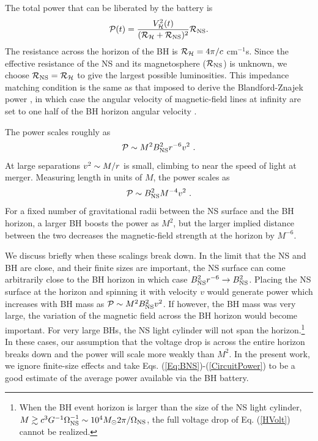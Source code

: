 The total power that can be liberated by the battery is
\begin{align}
\label{CircuitPower}
\mathcal{P}(t) = \frac{ V^2_{\mathcal{H}}(t) }{( \mathcal{R}_{\mathcal{H}} +
  \mathcal{R}_{\rm NS} )^2 } \mathcal{R}_{\rm NS} .
\end{align}
The resistance across the horizon of the BH is
$\mathcal{R}_{\mathcal{H}}=4\pi/c$ cm$^{-1}$s.  Since the effective
resistance of the NS and its magnetosphere ($\mathcal{R}_{\rm NS}$) is
unknown, we choose $\mathcal{R}_{\rm NS} = \mathcal{R}_{\mathcal{H}}$ to give the
largest possible luminosities. This impedance matching condition is
the same as that imposed to derive the Blandford-Znajek power
\citep{BZ:1977}, in which case the angular velocity of magnetic-field
lines at infinity are set to one half of the BH horizon angular
velocity \citep{MPBook, Penna:ImpMatch2015}.


The power scales roughly as
\begin{equation}
\mathcal{P} \sim M^2 B_{\rm NS}^2 r^{-6} v^{2} \ .
\end{equation}
At large separations $v^2 \sim M/r$ is small, climbing to near the
speed of light at merger.  Measuring length in units of $M$, the power
scales as
\begin{equation}
\mathcal{P} \sim B_{\rm NS}^2 M^{-4} v^{2} \ .
\end{equation}
For a fixed number of gravitational radii between the NS surface and
the BH horizon, a larger BH boosts the power as $M^2$, but the larger
implied distance between the two decreases the magnetic-field strength
at the horizon by $M^{-6}$.

We discuss briefly when these scalings break down. In the limit that
the NS and BH are close, and their finite sizes are important, the NS
surface can come arbitrarily close to the BH horizon in which case
$B_{\rm NS}^2 r^{-6} \rightarrow B_{\rm NS}^2$. Placing the NS
surface at the horizon and spinning it with velocity $v$ would
generate power which increases with BH mass as $\mathcal{P} \sim M^2 B_{\rm
  NS}^2 v^{2}$. If however, the BH mass was very large, the variation
of the magnetic field across the BH horizon would become
important. For very large BHs, the NS light cylinder will not span the horizon.\footnote{When the BH event horizon is larger than the size of the NS light cylinder, $M \gtrsim c^3 G^{-1} \Omega^{-1}_{\rm
  NS} \sim 10^4 M_{\odot} 2 \pi/\Omega_{\rm NS}$, the full voltage drop of Eq. (\ref{HVolt}) cannot be realized.}
%  
In these cases, our assumption that the voltage drop is across the entire horizon breaks down and the
power will scale more weakly than $M^2$. In the present work, we
ignore finite-size effects and take
Eqs. (\ref{Eq:BNS})-(\ref{CircuitPower}) to be a good estimate of the
average power available via the BH battery.


